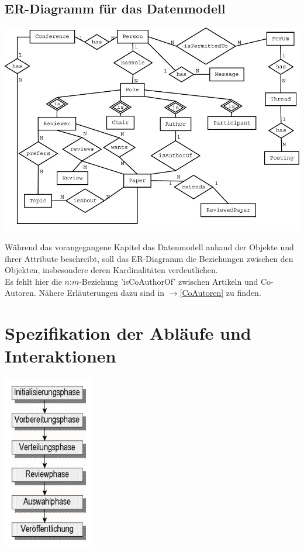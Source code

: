 \documentclass[headexclude,footexclude,12pt,BCOR0pt,DIV15]{scrartcl}
\begin{document}
    \subsection{ER-Diagramm f\"{u}r das Datenmodell}
        \begin{center}\includegraphics[width=15cm]{CoMa-ER-Diagramm}\end{center}
        W\"{a}hrend das vorangegangene Kapitel das Datenmodell anhand der Objekte und ihrer Attribute
        beschreibt, soll das ER-Diagramm die Beziehungen zwischen den Objekten, insbesondere deren
        Kardinalit\"{a}ten verdeutlichen. \\
        Es fehlt hier die $n$:$m$-Beziehung 'isCoAuthorOf' zwischen Artikeln und Co-Autoren.
        N\"{a}here Erl\"{a}uterungen dazu sind in $\rightarrow$\ref{CoAutoren} zu finden.

\pagebreak

    \section{Spezifikation der Abl\"{a}ufe und Interaktionen}
    \begin{center}\includegraphics[width=4cm]{ablauf1}\end{center}
\end{document}
